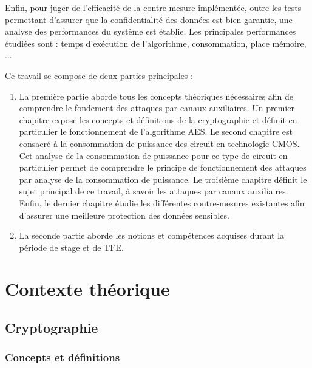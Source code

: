 \documentclass[oneside]{book}
\begin{document}
Enfin, pour juger de l'efficacité de la contre-mesure implémentée, outre les tests permettant d'assurer que la confidentialité des données est bien garantie, une analyse des performances du système est établie. Les principales performances étudiées sont : temps d'exécution de l'algorithme, consommation, place mémoire, ...

\hspace{-0.5cm}Ce travail se compose de deux parties principales : 
\begin{enumerate}
\item La première partie aborde tous les concepts théoriques nécessaires afin de comprendre le fondement des attaques par canaux auxiliaires. Un premier chapitre expose les concepts et définitions de la cryptographie et définit en particulier le fonctionnement de l'algorithme AES. Le second chapitre est consacré à la consommation de puissance des circuit en technologie CMOS. Cet analyse de la consommation de puissance pour ce type de circuit en particulier permet de comprendre le principe de fonctionnement des attaques par analyse de la consommation de puissance. Le troisième chapitre définit le sujet principal de ce travail, à savoir les attaques par canaux auxiliaires. Enfin, le dernier chapitre étudie les différentes contre-mesures existantes afin d'assurer une meilleure protection des données sensibles. 
\item La seconde partie aborde les notions et compétences acquises durant la période de stage et de TFE. 
\end{enumerate}


\newpage


\part{Contexte théorique}


\chapter{Cryptographie}

\section{Concepts et définitions}
\label{sec:Concepts}
\end{document}
